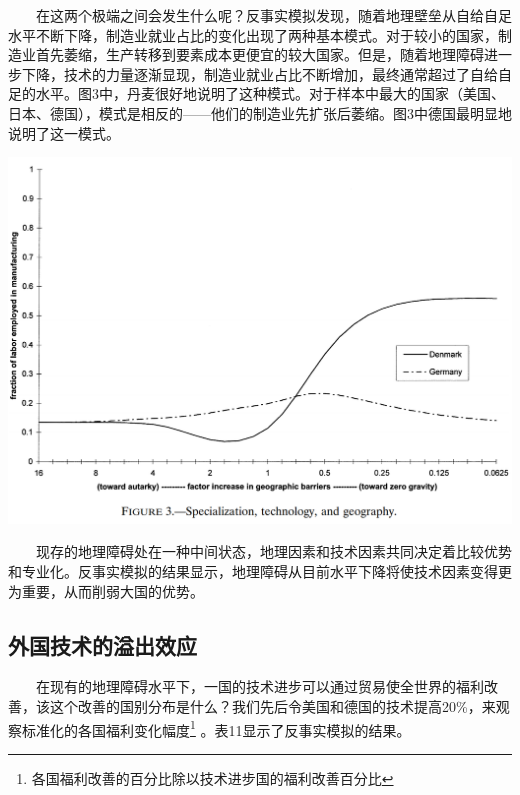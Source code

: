 \documentclass[]{article}
\let\rmarkdownfootnote\footnote%
\def\footnote{\protect\rmarkdownfootnote}
\begin{document}
　　在这两个极端之间会发生什么呢？反事实模拟发现，随着地理壁垒从自给自足水平不断下降，制造业就业占比的变化出现了两种基本模式。对于较小的国家，制造业首先萎缩，生产转移到要素成本更便宜的较大国家。但是，随着地理障碍进一步下降，技术的力量逐渐显现，制造业就业占比不断增加，最终通常超过了自给自足的水平。图3中，丹麦很好地说明了这种模式。对于样本中最大的国家（美国、日本、德国），模式是相反的------他们的制造业先扩张后萎缩。图3中德国最明显地说明了这一模式。

\begin{center}\includegraphics[width=1\linewidth]{Figures/Figure3} \end{center}

　　现存的地理障碍处在一种中间状态，地理因素和技术因素共同决定着比较优势和专业化。反事实模拟的结果显示，地理障碍从目前水平下降将使技术因素变得更为重要，从而削弱大国的优势。

\hypertarget{section-28}{%
\subsection{外国技术的溢出效应}\label{section-28}}

　　在现有的地理障碍水平下，一国的技术进步可以通过贸易使全世界的福利改善，该这个改善的国别分布是什么？我们先后令美国和德国的技术提高20\%，来观察标准化的各国福利变化幅度\footnote{各国福利改善的百分比除以技术进步国的福利改善百分比} 。表11显示了反事实模拟的结果。
\end{document}
